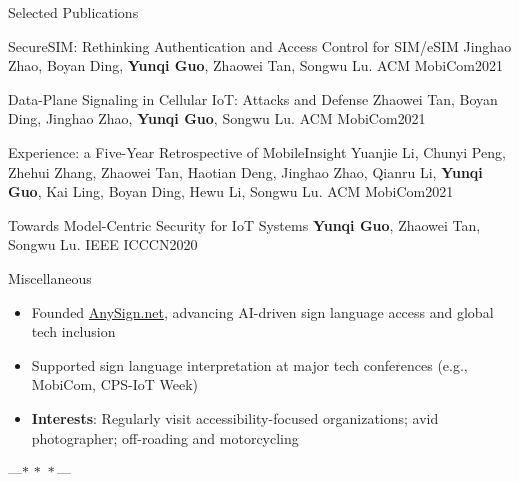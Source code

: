 \documentclass{resume} %
\begin{document}
\begin{rSection}{Selected Publications}
\begin{rPublication}
{SecureSIM: Rethinking Authentication and Access Control for SIM/eSIM}
{Jinghao Zhao, Boyan Ding, \textbf{Yunqi Guo}, Zhaowei Tan, Songwu Lu.}
{ACM MobiCom}{2021}
\end{rPublication}

\begin{rPublication}
{Data-Plane Signaling in Cellular IoT: Attacks and Defense}
{Zhaowei Tan, Boyan Ding, Jinghao Zhao, \textbf{Yunqi Guo}, Songwu Lu.}
{ACM MobiCom}{2021}
\end{rPublication}

\begin{rPublication}
{Experience: a Five-Year Retrospective of MobileInsight}
{Yuanjie Li, Chunyi Peng, Zhehui Zhang, Zhaowei Tan, Haotian Deng, Jinghao Zhao, Qianru Li, \textbf{Yunqi Guo}, Kai Ling, Boyan Ding, Hewu Li, Songwu Lu.}
{ACM MobiCom}{2021}
\end{rPublication}

\begin{rPublication}
{Towards Model-Centric Security for IoT Systems}
{\textbf{Yunqi Guo}, Zhaowei Tan, Songwu Lu.}
{IEEE ICCCN}{2020}
\end{rPublication}

\end{rSection}

\begin{rSection}{Miscellaneous}
\begin{itemize}
  \item Founded \url{AnySign.net}, advancing AI-driven sign language access and global tech inclusion
  \item Supported sign language interpretation at major tech conferences (e.g., MobiCom, CPS-IoT Week)
  \item \textbf{Interests}: Regularly visit accessibility-focused organizations; avid photographer; off-roading and motorcycling
\end{itemize}
\end{rSection}

\vspace{.5cm}
\begin{center}
---${\ast}\,{\ast}\,{\ast}$---
\end{center}
\end{document}
